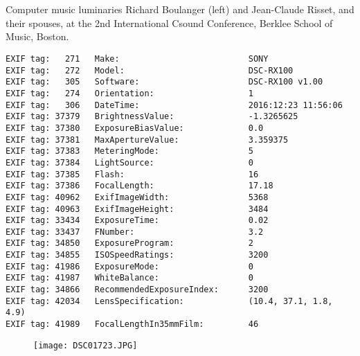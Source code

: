 \section{\protect{}}
\noindent Computer music luminaries Richard Boulanger (left) and Jean-Claude Risset, and their spouses, at the 2nd International Csound Conference, Berklee School of Music, Boston.
\noindent
\begin{lstlisting}
EXIF tag:   271   Make:                          SONY
EXIF tag:   272   Model:                         DSC-RX100
EXIF tag:   305   Software:                      DSC-RX100 v1.00
EXIF tag:   274   Orientation:                   1
EXIF tag:   306   DateTime:                      2016:12:23 11:56:06
EXIF tag: 37379   BrightnessValue:               -1.3265625
EXIF tag: 37380   ExposureBiasValue:             0.0
EXIF tag: 37381   MaxApertureValue:              3.359375
EXIF tag: 37383   MeteringMode:                  5
EXIF tag: 37384   LightSource:                   0
EXIF tag: 37385   Flash:                         16
EXIF tag: 37386   FocalLength:                   17.18
EXIF tag: 40962   ExifImageWidth:                5368
EXIF tag: 40963   ExifImageHeight:               3484
EXIF tag: 33434   ExposureTime:                  0.02
EXIF tag: 33437   FNumber:                       3.2
EXIF tag: 34850   ExposureProgram:               2
EXIF tag: 34855   ISOSpeedRatings:               3200
EXIF tag: 41986   ExposureMode:                  0
EXIF tag: 41987   WhiteBalance:                  0
EXIF tag: 34866   RecommendedExposureIndex:      3200
EXIF tag: 42034   LensSpecification:             (10.4, 37.1, 1.8, 4.9)
EXIF tag: 41989   FocalLengthIn35mmFilm:         46

\end{lstlisting}
\clearpage
\begin{figure}
\raggedleft
\texttt{[image: DSC01723.JPG]}
\end{figure}


\clearpage
